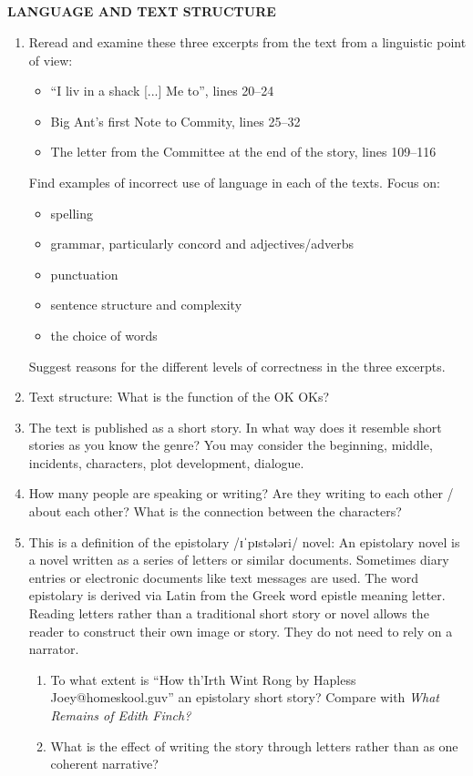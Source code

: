 \documentclass[10pt,a4paper,table]{article}
\newcommand{\qm}[1]{``#1''}
\begin{document}
\subsection{}
\textbf{LANGUAGE AND TEXT STRUCTURE}
\begin{enumerate}[label=\arabic*., leftmargin=*]
  \item Reread and examine these three excerpts from the text from a linguistic point of view:
  \begin{itemize}[leftmargin=1.5em]
    \item \qm{I liv in a shack [...] Me to}, lines 20--24
    \item Big Ant's first Note to Commity, lines 25--32
    \item The letter from the Committee at the end of the story, lines 109--116
  \end{itemize}
  Find examples of incorrect use of language in each of the texts. Focus on:
  \begin{itemize}[leftmargin=1.5em]
    \item spelling
    \item grammar, particularly concord and adjectives/adverbs
    \item punctuation
    \item sentence structure and complexity
    \item the choice of words
  \end{itemize}
  Suggest reasons for the different levels of correctness in the three excerpts.

  \item Text structure: What is the function of the OK OKs?

  \item The text is published as a short story. In what way does it resemble short stories as you know the genre? You may consider the beginning, middle, incidents, characters, plot development, dialogue.

  \item How many people are speaking or writing? Are they writing to each other / about each other? What is the connection between the characters?

  \item This is a definition of the epistolary /ɪˈpɪstələri/ novel: An epistolary novel is a novel written as a series of letters or similar documents. Sometimes diary entries or electronic documents like text messages are used. The word epistolary is derived via Latin from the Greek word epistle meaning letter. Reading letters rather than a traditional short story or novel allows the reader to construct their own image or story. They do not need to rely on a narrator.
  \begin{enumerate}[label=\textbf{\alph*.}, leftmargin=1.5em]
    \item To what extent is \qm{How th'Irth Wint Rong by Hapless Joey@homeskool.guv} an epistolary short story? Compare with \emph{What Remains of Edith Finch?}
    \item What is the effect of writing the story through letters rather than as one coherent narrative?
  \end{enumerate}


\end{enumerate}
\end{document}
